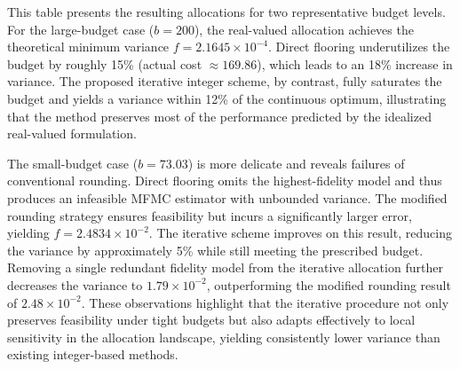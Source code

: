 This table presents the resulting allocations for two representative budget levels. For the large-budget case ($b=200$), the real-valued allocation achieves the theoretical minimum variance $f=2.1645\times 10^{-4}$. Direct flooring underutilizes the budget by roughly 15\% (actual cost $\approx 169.86$), which leads to an 18\% increase in variance. The proposed iterative integer scheme, by contrast, fully saturates the budget and yields a variance within 12\% of the continuous optimum, illustrating that the method preserves most of the performance predicted by the idealized real-valued formulation.


The small-budget case ($b=73.03$) is more delicate and reveals failures of conventional rounding. Direct flooring omits the highest-fidelity model and thus produces an infeasible MFMC estimator with unbounded variance. The modified rounding strategy ensures feasibility but incurs a significantly larger error, yielding $f=2.4834\times 10^{-2}$. The iterative scheme improves on this result, reducing the variance by approximately 5\% while still  meeting the prescribed budget. Removing a single redundant fidelity model from the iterative allocation further decreases the variance to $1.79\times 10^{-2}$, outperforming the modified rounding result of $2.48\times 10^{-2}$. These observations highlight that the iterative procedure not only preserves feasibility under tight budgets but also adapts effectively to local sensitivity in the allocation landscape, yielding consistently lower variance than existing integer-based methods.










